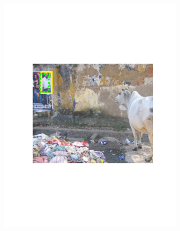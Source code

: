 \begin{figure}[hbt]
    \begin{subfigure}[b]{0.45\textwidth}
        \centering
        \includegraphics[width=\textwidth]{TP30932}
        \caption{}
        \label{fig:dettn3}
    \end{subfigure}
    ~
    \begin{subfigure}[b]{0.45\textwidth}
        \centering

\end{subfigure}
\end{figure}
